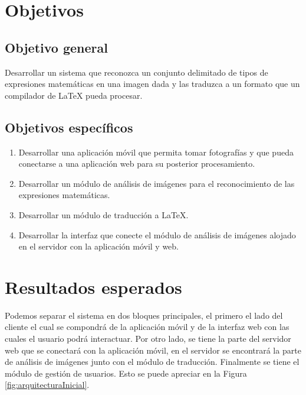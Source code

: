 \section{Objetivos}
\subsection{Objetivo general}
Desarrollar un sistema que reconozca un conjunto delimitado de tipos de expresiones matemáticas en una imagen dada y las traduzca a un formato que un compilador de LaTeX pueda procesar.
\subsection{Objetivos específicos}
\begin{enumerate}
	\item Desarrollar una aplicación móvil que permita tomar fotografías y que pueda conectarse a una aplicación web para su posterior procesamiento.
	\item Desarrollar un módulo de análisis de imágenes para el reconocimiento de las expresiones matemáticas.
	\item Desarrollar un módulo de traducción a LaTeX.
	\item Desarrollar la interfaz que conecte el módulo de análisis de imágenes alojado en el servidor con la aplicación móvil y web.
\end{enumerate}


\section{Resultados esperados}
Podemos separar el sistema en dos bloques principales, el primero el lado del cliente el cual se compondrá de la aplicación móvil y de la interfaz web con las cuales el usuario podrá interactuar. Por otro lado, se tiene la parte del servidor web que se conectará con la aplicación móvil, en el servidor se encontrará la parte de análisis de imágenes junto con el módulo de traducción. Finalmente se tiene el módulo de gestión de usuarios. Esto se puede apreciar en la Figura \ref{fig:arquitecturaInicial}.%

